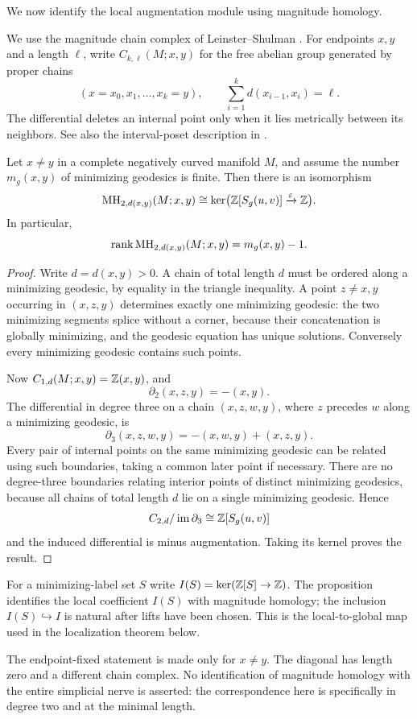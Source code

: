 We now identify the local augmentation module using magnitude homology.

We use the magnitude chain complex of Leinster--Shulman
\cite{LeinsterShulman2021}. For endpoints $x,y$ and a
length $\ell$, write $C_{k,\ell}(M;x,y)$ for the free
abelian group generated by proper chains
\[
 (x=x_0,x_1,\ldots,x_k=y),
 \qquad \sum_{i=1}^k d(x_{i-1},x_i)=\ell.
\]
The differential deletes an internal point only when it
lies metrically between its neighbors. See also the
interval-poset description in \cite{KanetaYoshinaga2021}.

\begin{proposition}\label{prop:MH-minimal}
Let $x\ne y$ in a complete negatively curved manifold $M$,
and assume the number $m_g(x,y)$ of minimizing geodesics
is finite. Then there is an isomorphism
\[
 \mathrm{MH}_{2,d(x,y)}(M;x,y)
 \cong\ker\bigl(\mathbb{Z}[S_g(u,v)]
               \xrightarrow{\varepsilon}\mathbb{Z}\bigr).
\]
In particular,
\[
 \operatorname{rank}\mathrm{MH}_{2,d(x,y)}(M;x,y)
 =m_g(x,y)-1.
\]
\end{proposition}

\begin{proof}
Write $d=d(x,y)>0$. A chain of total length $d$
must be ordered along a minimizing geodesic, by equality
in the triangle inequality. A point $z\ne x,y$ occurring
in $(x,z,y)$ determines exactly one minimizing geodesic:
the two minimizing segments splice without a corner,
because their concatenation is globally minimizing,
and the geodesic equation has unique solutions.
Conversely every minimizing geodesic contains such points.

Now $C_{1,d}(M;x,y)=\mathbb{Z}(x,y)$, and
\[
 \partial_2(x,z,y)=-(x,y).
\]
The differential in degree three on a chain
$(x,z,w,y)$, where $z$ precedes $w$ along a
minimizing geodesic, is
\[
 \partial_3(x,z,w,y)
 =-(x,w,y)+(x,z,y).
\]
Every pair of internal points on the same minimizing
geodesic can be related using such boundaries, taking
a common later point if necessary. There are no
degree-three boundaries relating interior points of
distinct minimizing geodesics, because all chains
of total length $d$ lie on a single minimizing
geodesic. Hence
\[
 C_{2,d}/\operatorname{im}\partial_3
 \cong\mathbb{Z}[S_g(u,v)]
\]
and the induced differential is minus augmentation.
Taking its kernel proves the result.
\end{proof}

For a minimizing-label set $S$ write
$I(S)=\ker(\mathbb{Z}[S]\to\mathbb{Z})$. The proposition identifies
the local coefficient $I(S)$ with magnitude homology;
the inclusion $I(S)\hookrightarrow I$ is natural
after lifts have been chosen. This is the local-to-global
map used in the localization theorem below.

\begin{remark}
The endpoint-fixed statement is made only for $x\ne y$.
The diagonal has length zero and a different chain complex.
No identification of magnitude homology with the entire
simplicial nerve is asserted: the correspondence here
is specifically in degree two and at the minimal length.
\end{remark}
